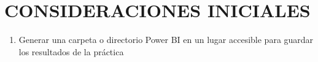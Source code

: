 \section{CONSIDERACIONES INICIALES} 

\begin{enumerate}[1.]
	\item Generar una carpeta o directorio Power BI en un lugar accesible para guardar los resultados de la práctica	


\end{enumerate} 

